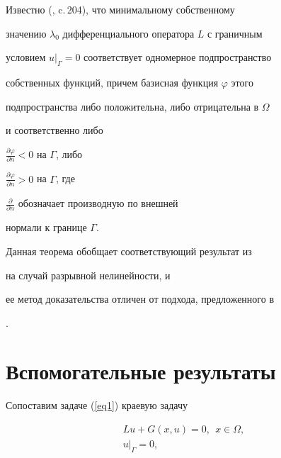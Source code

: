 \begin{note}


Известно (\cite{Gil}, c.\,204), что  минимальному собственному 


значению $\lambda_0$ дифференциального оператора $L$ с граничным 


условием $u|_{\Gamma}=0$ соответствует одномерное подпространство 


собственных функций, причем базисная функция $\varphi$ этого 


подпространства либо положительна, либо отрицательна в $\Omega$ 


и соответственно либо


$\frac{\partial \varphi}{ \partial n} <0$ на $\Gamma$, либо


$\frac{\partial \varphi}{ \partial n} >0$ на $\Gamma$, где


$\frac{\partial}{ \partial n}$ обозначает производную по внешней


нормали к границе $\Gamma$.


\end{note}








\begin{note}


Данная теорема обобщает соответствующий результат из \cite{Adl} 


на случай разрывной нелинейности, и


ее метод доказательства отличен от подхода, предложенного в


\cite{Adl}.


\end{note}








\section{Вспомогательные результаты}





Сопоставим задаче (\ref{eq1}) краевую задачу


\begin{gather}\label{eq3}


Lu+G(x,u)=0,\ \ x\in\Omega, \\


%


\label{eq4}


u |_{\Gamma}=0,


\end{gather}


